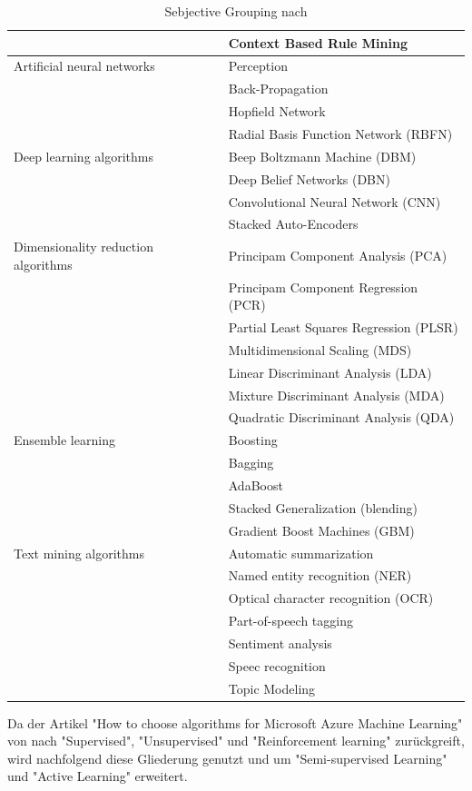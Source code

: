 \begin{table}[H]
\begin{tabular}{|l|l|}
& Context Based Rule Mining\\
\hline
Artificial neural networks & Perception\\
& Back-Propagation\\
& Hopfield Network\\
& Radial Basis Function Network (RBFN)\\
\hline
Deep learning algorithms & Beep Boltzmann Machine (DBM)\\
& Deep Belief Networks (DBN)\\
& Convolutional Neural Network (CNN)\\
& Stacked Auto-Encoders\\
\hline
Dimensionality reduction algorithms & Principam Component Analysis (PCA)\\
& Principam Component Regression (PCR)\\
& Partial Least Squares Regression (PLSR)\\
& Multidimensional Scaling (MDS)\\
& Linear Discriminant Analysis (LDA)\\
& Mixture Discriminant Analysis (MDA)\\
& Quadratic Discriminant Analysis (QDA)\\
\hline
Ensemble learning & Boosting\\
& Bagging\\
& AdaBoost\\
& Stacked Generalization (blending)\\
& Gradient Boost Machines (GBM)\\
\hline
Text mining algorithms & Automatic summarization\\
& Named entity recognition (NER)\\
& Optical character recognition (OCR)\\
& Part-of-speech tagging\\
& Sentiment analysis\\
& Speec recognition\\
& Topic Modeling\\
   \hline
\end{tabular}
\caption{Sebjective Grouping nach \citep[S.~224-229]{ramasubramanian_machine_2017}}
\label{tab:SebjectiveGrouping}
\end{table}

Da der Artikel "How to choose algorithms for Microsoft Azure Machine Learning" von \citep{ericson_microsoft_2017} nach "Supervised", "Unsupervised" und "Reinforcement learning" zurückgreift, wird nachfolgend diese Gliederung genutzt und um "Semi-supervised Learning" und "Active Learning" erweitert. \par


